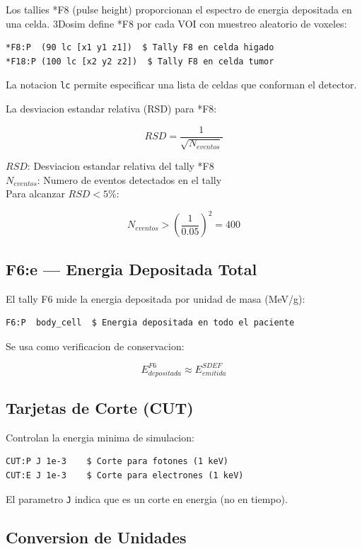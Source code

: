 \documentclass[12pt,a4paper]{article}
\newcommand{\vardef}[2]{\noindent\textbf{#1}: #2\\}
\begin{document}
Los tallies *F8 (pulse height) proporcionan el espectro de energia depositada en una celda. 3Dosim define *F8 por cada VOI con muestreo aleatorio de voxeles:

\begin{verbatim}
*F8:P  (90 lc [x1 y1 z1])  $ Tally F8 en celda higado
*F18:P (100 lc [x2 y2 z2])  $ Tally F8 en celda tumor
\end{verbatim}

La notacion \texttt{lc} permite especificar una lista de celdas que conforman el detector.

La desviacion estandar relativa (RSD) para *F8:

$$
RSD = \frac{1}{\sqrt{N_{eventos}}}
$$

\vardef{$RSD$}{Desviacion estandar relativa del tally *F8}
\vardef{$N_{eventos}$}{Numero de eventos detectados en el tally}

Para alcanzar $RSD < 5\%$:

$$
N_{eventos} > \left(\frac{1}{0.05}\right)^2 = 400
$$

\subsection{F6:e --- Energia Depositada Total}

El tally F6 mide la energia depositada por unidad de masa (MeV/g):

\begin{verbatim}
F6:P  body_cell  $ Energia depositada en todo el paciente
\end{verbatim}

Se usa como verificacion de conservacion:

$$
E_{depositada}^{F6} \approx E_{emitida}^{SDEF}
$$

\subsection{Tarjetas de Corte (CUT)}

Controlan la energia minima de simulacion:

\begin{verbatim}
CUT:P J 1e-3    $ Corte para fotones (1 keV)
CUT:E J 1e-3    $ Corte para electrones (1 keV)
\end{verbatim}

El parametro \texttt{J} indica que es un corte en energia (no en tiempo).

\subsection{Conversion de Unidades}
\end{document}
